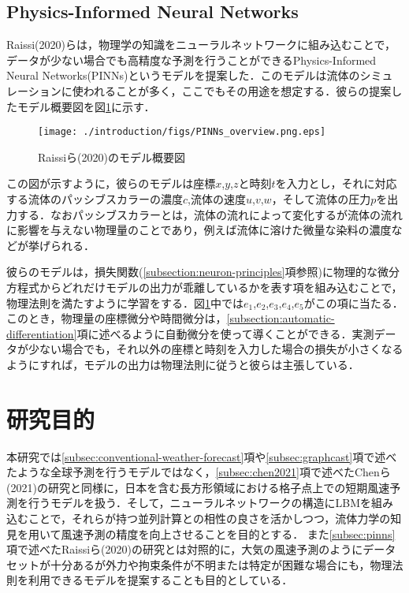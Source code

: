 \subsection{Physics-Informed Neural Networks \label{subsec:pinns}}
Raissi(2020)らは，物理学の知識をニューラルネットワークに組み込むことで，データが少ない場合でも高精度な予測を行うことができるPhysics-Informed Neural Networks(PINNs)というモデルを提案した\cite{PINNs2020}．このモデルは流体のシミュレーションに使われることが多く\cite{app13126892}，ここでもその用途を想定する．彼らの提案したモデル概要図を図\ref{fig:pinns-overview}に示す．
\begin{figure}[bp]
    \centering
    \texttt{[image: ./introduction/figs/PINNs\_overview.png.eps]}
    \caption{Raissiら(2020)のモデル概要図\cite{PINNs2020}}
    \label{fig:pinns-overview}
\end{figure}
この図が示すように，彼らのモデルは座標$x$,$y$,$z$と時刻$t$を入力とし，それに対応する流体のパッシブスカラーの濃度$c$,流体の速度$u$,$v$,$w$，そして流体の圧力$p$を出力する．なおパッシブスカラーとは，流体の流れによって変化するが流体の流れに影響を与えない物理量のことであり，例えば流体に溶けた微量な染料の濃度などが挙げられる\cite{Lesieur1990}．

彼らのモデルは，損失関数(\ref{subsection:neuron-principles}項参照)に物理的な微分方程式からどれだけモデルの出力が乖離しているかを表す項を組み込むことで，物理法則を満たすように学習をする．図\ref{fig:pinns-overview}中では$e_1$,$e_2$,$e_3$,$e_4$,$e_5$がこの項に当たる．このとき，物理量の座標微分や時間微分は，\ref{subsection:automatic-differentiation}項に述べるように自動微分を使って導くことができる．実測データが少ない場合でも，それ以外の座標と時刻を入力した場合の損失が小さくなるようにすれば，モデルの出力は物理法則に従うと彼らは主張している．





\section{研究目的}
本研究では\ref{subsec:conventional-weather-forecast}項や\ref{subsec:graphcast}項で述べたような全球予測を行うモデルではなく，\ref{subsec:chen2021}項で述べたChenら(2021)の研究と同様に，日本を含む長方形領域における格子点上での短期風速予測を行うモデルを扱う．そして，ニューラルネットワークの構造にLBMを組み込むことで，それらが持つ並列計算との相性の良さを活かしつつ，流体力学の知見を用いて風速予測の精度を向上させることを目的とする．
また\ref{subsec:pinns}項で述べたRaissiら(2020)の研究とは対照的に，大気の風速予測のようにデータセットが十分あるが外力や拘束条件が不明または特定が困難な場合にも，物理法則を利用できるモデルを提案することも目的としている． %

